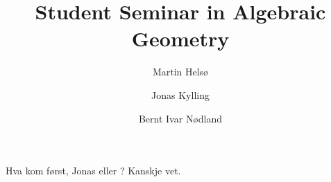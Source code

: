 \documentclass[a4paper, UKenglish]{report}
\title
{
    \bfseries\sffamily
    Student Seminar in Algebraic Geometry
}
\author
{
    Martin Hels\o
    \and
    Jonas Kylling
    \and 
    Bernt Ivar N\o dland
}
\begin{document}
\begin{titlepage}
    \maketitle
\end{titlepage}

\noindent Hva kom først, Jonas eller \kern-7pt \egg ? Kanskje \cite{Huy06} vet.


\clearpage
\printbibliography
\end{document}
